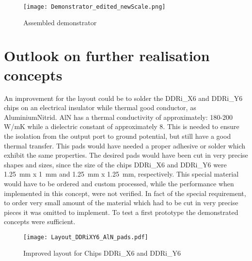 \begin{figure}[htb!] %
	\centering
  \texttt{[image: Demonstrator\_edited\_newScale.png]}
	\caption{Assembled demonstrator}
	\label{fig:assembledDemonstrator}
\end{figure}

\section{Outlook on further realisation concepts}
An improvement for the layout could be to solder the DDRi\_X6 and DDRi\_Y6 chips on an electrical insulator while thermal good conductor, as AluminiumNitrid.
AlN has a thermal conductivity of approximately: 180-200 W/mK while a dielectric constant of approximately 8. 
This is needed to ensure the isolation from the output port to ground potential, but still have a good thermal transfer.
This pads would have needed a proper adhesive or solder which exhibit the same properties.
The desired pads would have been cut in very precise shapes and sizes, since the size of the chips DDRi\_X6 and DDRi\_Y6 were \SI{1.25}{\milli \meter} x \SI{1}{\milli \meter} and \SI{1.25}{\milli \meter} x \SI{1.25}{\milli \meter}, respectively.
This special material would have to be ordered and custom processed, while the performance when implemented in this concept, were not verified.
In fact of the special requirement, to order very small amount of the material which had to be cut in very precise pieces it was omitted to implement.
To test a first prototype the demonstrated concepts were sufficient.


\begin{figure}[htb!]
	\centering
  \texttt{[image: Layout\_DDRiXY6\_AlN\_pads.pdf]}
	\caption{Improved layout for Chips DDRi\_X6 and DDRi\_Y6}
	\label{fig:DDRiXY6AlNpads}
\end{figure}
